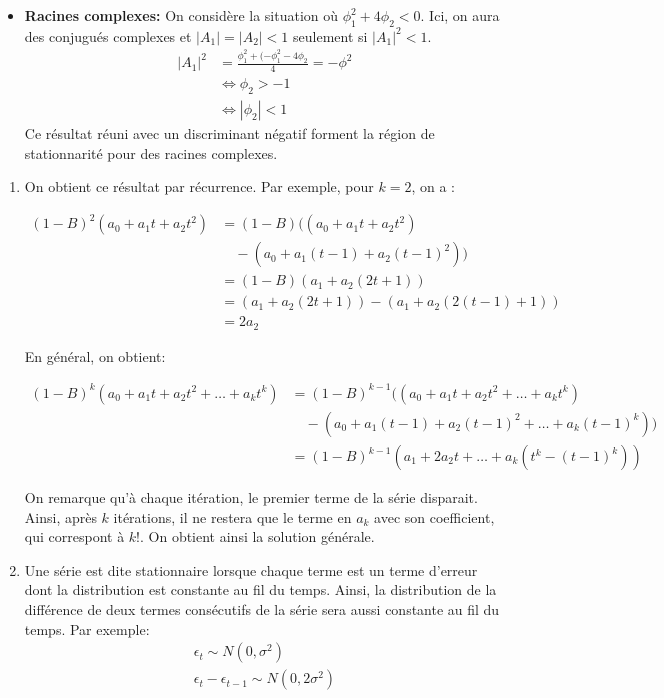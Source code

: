 \begin{solution}{2.1}
\begin{itemize}
\item \textbf{Racines complexes:}
On considère la situation où $\phi_1^2+4\phi_2<0$. Ici, on aura des conjugués complexes et $|A_1| = |A_2| <1$ seulement si $|A_1|^2<1$.
\begin{align*}
|A_1|^2 &=\frac{\phi_1^2+(-\phi_1^2-4\phi_2}{4}=-\phi^2 \\
&\Leftrightarrow \phi_2>-1 \\
&\Leftrightarrow |\phi_2|<1
\end{align*}
Ce résultat réuni avec un discriminant négatif forment la région de stationnarité pour des racines complexes.
\end{itemize}
\end{solution}
\begin{solution}{2.2}
\begin{enumerate}

\item On obtient ce résultat par récurrence. Par exemple, pour $k=2$, on a :

\begin{align*}
(1-B)^2 (a_0+a_1t+a_2t^2) &= (1-B) ((a_0+a_1t+a_2t^2)\\ &\quad- (a_0+a_1(t-1)+a_2(t-1)^2)) \\
&= (1-B) (a_1+a_2(2t+1)) \\
&= (a_1+a_2(2t+1)) - (a_1+a_2(2(t-1)+1)) \\
&= 2a_2
\end{align*}

En général, on obtient:

\begin{align*}
(1-B)^k (a_0+a_1t+a_2t^2+\ldots+a_kt^k) &= (1-B)^{k-1} ((a_0+a_1t+a_2t^2+\ldots+a_kt^k)\\ &\quad- (a_0+a_1(t-1)+a_2(t-1)^2+\ldots+a_k(t-1)^k)) \\
&= (1-B)^{k-1} (a_1 + 2a_2t+\ldots+a_k(t^k-(t-1)^k))
\end{align*}

On remarque qu'à chaque itération, le premier terme de la série disparait. Ainsi, après $k$ itérations, il ne restera que le terme en $a_k$ avec son coefficient, qui correspont à $k!$. On obtient ainsi la solution générale.

\item Une série est dite stationnaire lorsque chaque terme est un terme d'erreur dont la distribution est constante au fil du temps. Ainsi, la distribution de la différence de deux termes consécutifs de la série sera aussi constante au fil du temps. Par exemple:
\begin{align*}
\epsilon_t \sim N(0,\sigma^2)  \\
\epsilon_t - \epsilon_{t-1} \sim N(0,2\sigma^2) \\
\end{align*}

\end{enumerate}
\end{solution}

